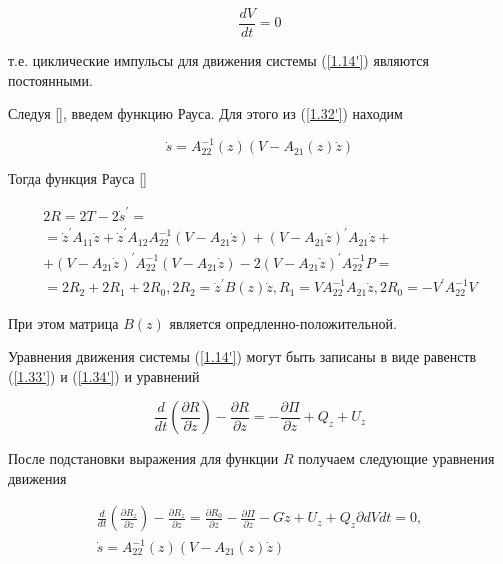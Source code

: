 \begin{equation} \label{1.33'}
\frac{d V}{d t} = 0
\end{equation}

т.е. циклические импульсы для движения системы (\ref{1.14'}) являются постоянными.

Следуя [], введем функцию Рауса. Для этого из (\ref{1.32'}) находим

\begin{equation} \label{1.34'}
\dot s = A_{22}^{-1} (z) (V - A_{21} (z) \dot z)
\end{equation}

Тогда функция Рауса [] 

\begin{equation} \label{1.35'}
\begin{array}{c}
	2R = 2T - 2 \dot s^{'} =\\
	= \dot z^{'} A_{11} \dot z + \dot z^{'} A_{12} A_{22}^{-1} (V - A_{21} \dot z) + (V - A_{21} \dot z)^{'} A_{21} \dot z +\\
	+ (V - A_21 \dot z)^{'} A_{22}^{-1} (V - A_{21} \dot z) - 2 (V - A_{21} \dot z)^{'} A_{22}^{-1} P =\\
	= 2 R_2 + 2 R_1 + 2 R_0, 2 R_2 = \dot z^{'} B (z) \dot z, R_1 = V A_{22}^{-1} A_{21} \dot z, 2 R_0 = - V^{'} A_{22}^{-1} V
\end{array}
\end{equation}

При этом матрица $B(z)$ является опредленно-положительной.

Уравнения движения системы (\ref{1.14'}) могут быть записаны в виде равенств (\ref{1.33'}) и (\ref{1.34'}) и уравнений

\begin{equation} \label{1.36'}
\frac{d}{dt} (\frac{\partial R}{\partial \dot z}) - \frac{\partial R}{\partial z} = - \frac{\partial \Pi}{\partial z} + Q_z + U_z
\end{equation}

После подстановки выражения для функции $R$ получаем следующие уравнения движения 

\begin{equation} \label{1.37'}
\begin{array}{c}
\frac{d}{dt} (\frac{\partial R_z}{\partial \dot z}) - \frac{\partial R_z}{\partial z} = \frac{\partial R_0}{\partial z} - \frac{\partial \Pi}{\partial z} - G \dot z + U_z + Q_z\partial{d V}{d t} = 0,\\
\dot s = A_{22}^{-1} (z) (V - A_{21} (z) \dot z)
\end{array}
\end{equation}

